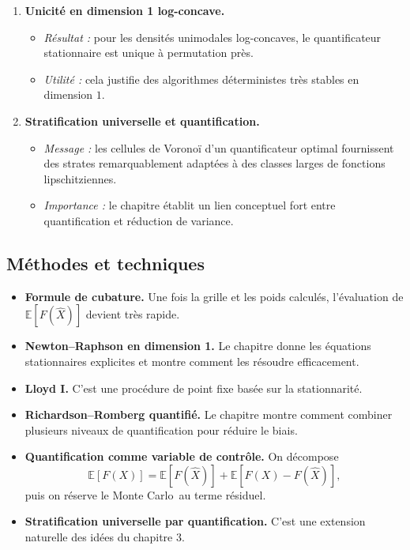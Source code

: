 \documentclass[11pt,a4paper]{article}
\newcommand{\E}{\mathbb{E}}
\newcommand{\mc}{Monte Carlo}
\begin{document}
\begin{enumerate}[label=\textbf{\arabic*.}]
  \item \textbf{Unicité en dimension 1 log-concave.}
  \begin{itemize}
    \item \emph{Résultat :} pour les densités unimodales log-concaves, le quantificateur stationnaire est unique à permutation près.
    \item \emph{Utilité :} cela justifie des algorithmes déterministes très stables en dimension $1$.
  \end{itemize}

  \item \textbf{Stratification universelle et quantification.}
  \begin{itemize}
    \item \emph{Message :} les cellules de Voronoï d'un quantificateur optimal fournissent des strates remarquablement adaptées à des classes larges de fonctions lipschitziennes.
    \item \emph{Importance :} le chapitre établit un lien conceptuel fort entre quantification et réduction de variance.
  \end{itemize}
\end{enumerate}

\subsection{Méthodes et techniques}

\begin{itemize}
  \item \textbf{Formule de cubature.} Une fois la grille et les poids calculés, l'évaluation de $\E[F(\hat X)]$ devient très rapide.
  \item \textbf{Newton--Raphson en dimension 1.} Le chapitre donne les équations stationnaires explicites et montre comment les résoudre efficacement.
  \item \textbf{Lloyd I.} C'est une procédure de point fixe basée sur la stationnarité.
  \item \textbf{Richardson--Romberg quantifié.} Le chapitre montre comment combiner plusieurs niveaux de quantification pour réduire le biais.
  \item \textbf{Quantification comme variable de contrôle.} On décompose
  \[
    \E[F(X)] = \E[F(\hat X)] + \E[F(X)-F(\hat X)],
  \]
  puis on réserve le \mc\ au terme résiduel.
  \item \textbf{Stratification universelle par quantification.} C'est une extension naturelle des idées du chapitre 3.
\end{itemize}
\end{document}

